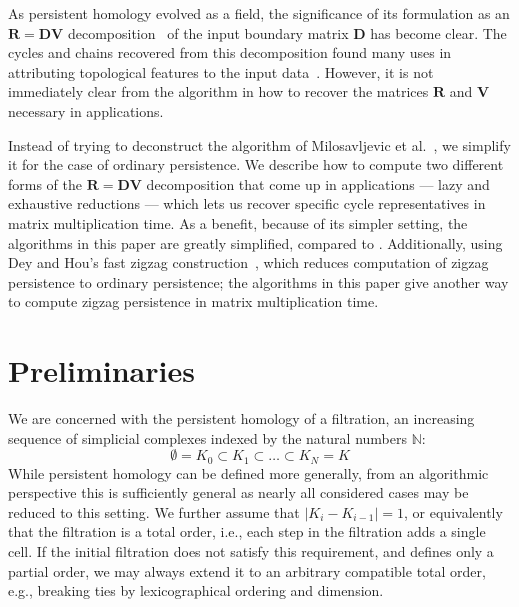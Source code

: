 \documentclass[10pt,a4paper]{article}
\newcommand{\mat}[1]{\mathbf{#1}}
\begin{document}
As persistent homology evolved as a field, the significance of its formulation as an $\mat{R} = \mat{D} \mat{V}$ decomposition~\cite{cohen2006vines} of the input boundary matrix $\mat{D}$ has become clear. The cycles and chains recovered from this decomposition found many uses in attributing topological features to the input data~\cite{dSMVJ11,CSLV22,NiMo24}. However, it is not immediately clear from the algorithm in \cite{milosavljevic2011zigzag} how to recover the matrices $\mat{R}$ and $\mat{V}$ necessary in applications.

Instead of trying to deconstruct the algorithm of Milosavljevic et al.~\cite{milosavljevic2011zigzag}, we simplify it for the case of ordinary persistence.
We describe how to compute two different forms of the $\mat{R} = \mat{D}\mat{V}$ decomposition that come up in applications --- lazy and exhaustive reductions --- which lets us recover specific cycle representatives in matrix multiplication time.
As a benefit, because of its simpler setting, the algorithms in this paper are greatly simplified, compared to \cite{milosavljevic2011zigzag}.
%
Additionally, using Dey and Hou's fast zigzag construction~\cite{dey2022fast}, which reduces computation of zigzag persistence to ordinary persistence; the algorithms in this paper give another way to compute zigzag persistence in matrix multiplication time.

\section{Preliminaries}
We are concerned with the persistent homology of a filtration,  an increasing sequence of simplicial complexes indexed by the natural numbers $\mathbb{N}$:
\[ \emptyset  =  K_0 \subset K_1 \subset \ldots \subset K_N =K\]
While persistent homology can be defined more generally, from an algorithmic
perspective this is sufficiently general as nearly all considered cases may be
reduced to this setting. We further assume that $| K_i -  K_{i-1}| = 1$, or
equivalently that the filtration is a total order, i.e., each step in the
filtration adds a single cell. If the initial filtration does not satisfy this
requirement, and defines only a partial order, we may always extend it to an
arbitrary compatible total order, e.g., breaking ties by lexicographical ordering and dimension.
\end{document}
